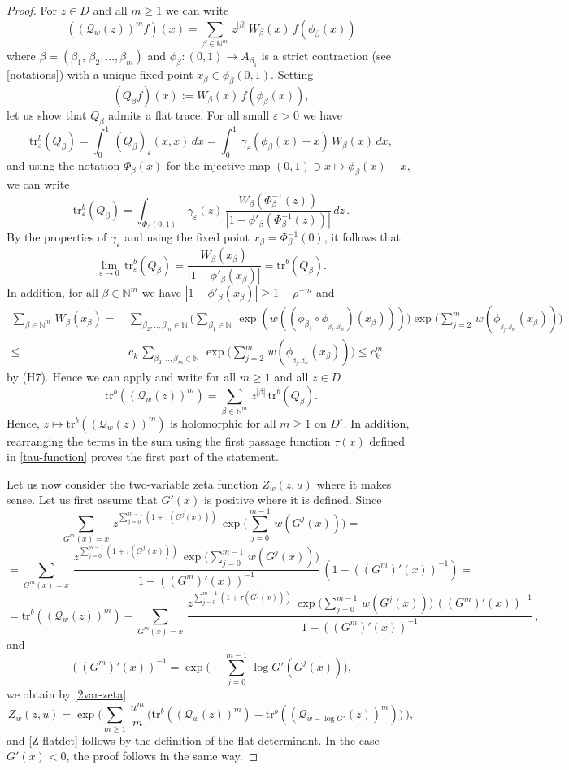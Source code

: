\documentclass[11pt]{amsart}
\theoremstyle{definition}
\theoremstyle{remark}
\theoremstyle{definition}
\numberwithin{equation}{section}
\newcommand{\N}{\mathbb N}
\newcommand{\eps}{\varepsilon}
\newcommand{\QQ}{\mathcal{Q}}
\newcommand{\flattr}{\text{tr}^b}
\begin{document}
\begin{proof}
For $z\in D$ and all $m\ge 1$ we can write
\[
((\QQ_w(z))^m f)(x) = \sum_{\beta \in \N^m}\, z^{|\beta|}\, W_\beta(x)\, f(\phi_\beta(x))
\]
where $\beta = (\beta_1,\, \beta_2,\dots,\beta_m)$ and $\phi_\beta :(0,1) \to A_{\beta_1}$ is a strict contraction (see \eqref{notations}) with a unique fixed point $x_\beta \in \phi_\beta(0,1)$. Setting
\[
(Q_\beta f)(x) := W_\beta(x)\, f(\phi_\beta(x)),
\]
let us show that $Q_\beta$ admits a flat trace. For all small $\eps>0$ we have
\[
\flattr_\eps(Q_\beta) = \int_0^1\, (Q_\beta)_\eps(x,x)\, dx = \int_0^1\, \gamma_\eps(\phi_\beta(x)-x)\, W_\beta(x)\, dx,
\]
and using the notation $\Phi_\beta(x)$ for the injective map $(0,1)\ni x\mapsto \phi_\beta(x)-x$, we can write
\[
\flattr_\eps(Q_\beta) = \int_{\Phi_\beta(0,1)}\, \gamma_\eps(z)\, \frac{W_\beta(\Phi_\beta^{-1}(z))}{|1-\phi'_\beta(\Phi_\beta^{-1}(z))|}\, dz\, .
\]
By the properties of $\gamma_\eps$ and using the fixed point $x_\beta = \Phi_\beta^{-1}(0)$, it follows that
\[
\lim_{\eps\to 0}\, \flattr_\eps(Q_\beta) = \frac{W_\beta(x_\beta)}{|1-\phi'_\beta(x_\beta)|} = \flattr(Q_\beta).
\]
In addition, for all $\beta \in \N^m$ we have $|1-\phi'_\beta(x_\beta)| \ge 1-\rho^{-m}$ and
\[
\begin{aligned}
\sum_{\beta \in \N^m}\, W_\beta(x_\beta) = &\, \sum_{\beta_2,..,\beta_m \in \N} \Big(\sum_{\beta_1\in \N}\, \exp (w((\phi_{\beta_1}\circ \phi_{_{\beta_2..\beta_m}})(x_\beta))) \Big) \exp \Big( \sum_{j=2}^m\, w(\phi_{_{\beta_j..\beta_m}}(x_\beta)) \Big) \\
\le &\, c_k\, \sum_{\beta_2,..,\beta_m \in \N}\, \exp \Big( \sum_{j=2}^m\, w(\phi_{_{\beta_j..\beta_m}}(x_\beta)) \Big) \le c_k^m
\end{aligned}
\]
by (H7). Hence we can apply \cite[Lemma 3.21]{bal-book-2} and write for all $m\ge 1$ and all $z\in D$
\[
\flattr((\QQ_w(z))^m) = \sum_{\beta \in \N^m}\, z^{|\beta|}\, \flattr(Q_\beta).
\]
{Hence, $z\mapsto \flattr((\QQ_w(z))^m)$ is holomorphic for all $m\ge 1$ on $D^\circ$. In addition,} rearranging the terms in the sum using the first passage function $\tau(x)$ defined in \eqref{tau-function} proves the first part of the statement. 

Let us now consider the two-variable zeta function $Z_w(z,u)$ where it makes sense. Let us first assume that $G'(x)$ is positive where it is defined. Since
\[
\sum_{G^m(x)=x}\, z^{\sum_{j=0}^{m-1} (1+\tau(G^j(x)))} \, \exp\Big(\sum_{j=0}^{m-1}\, w(G^j(x))\Big) =
\]
\[
= \sum_{G^m(x)=x}\, \frac{z^{\sum_{j=0}^{m-1} (1+\tau(G^j(x)))} \, \exp\Big(\sum_{j=0}^{m-1}\, w(G^j(x))\Big)}{1-((G^m)'(x))^{-1}} \, (1-((G^m)'(x))^{-1}) =
\]
\[
= \flattr((\QQ_w(z))^m) - \sum_{G^m(x)=x}\, \frac{z^{\sum_{j=0}^{m-1} (1+\tau(G^j(x)))} \, \exp\Big(\sum_{j=0}^{m-1}\, w(G^j(x))\Big)\, ((G^m)'(x))^{-1}}{1-((G^m)'(x))^{-1}}\, ,
\]
and
\[
((G^m)'(x))^{-1} = \exp \Big( - \sum_{j=0}^{m-1}\, \log G'(G^j(x)) \Big),
\]
we obtain by \eqref{2var-zeta}
\[
Z_w(z,u) = \exp \Big( \sum_{m\ge 1} \, \frac{u^m}m \, \Big(\flattr((\QQ_w(z))^m) - \flattr((\QQ_{w-\log G'}(z))^m)\Big)\, \Big),
\]
and \eqref{Z-flatdet} follows by the definition of the flat determinant. In the case $G'(x)<0$, the proof follows in the same way.
\end{proof}
\end{document}
